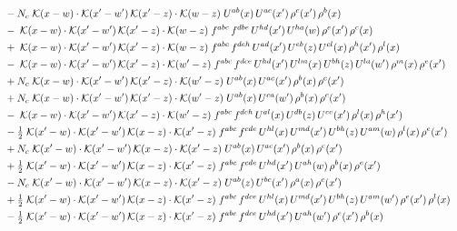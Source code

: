 \documentclass[9pt]{article}
\begin{document}
\begin{align}
&\quad -N_c\;\mathcal{K}(x-w)\cdot\mathcal{K}(x'-w')\,\mathcal{K}(x'-z)\cdot\mathcal{K}(w-z)\;U^{ab}(x)\,U^{ac}(x')\,\rho^{c}(x')\,\rho^{b}(x)\notag\\
&\quad -\;\mathcal{K}(x-w)\cdot\mathcal{K}(x'-w')\,\mathcal{K}(x'-z)\cdot\mathcal{K}(w-z)\;f^{abc}\,f^{dbe}\,U^{hd}(x')\,U^{ha}(w)\,\rho^{e}(x')\,\rho^{c}(x)\notag\\
&\quad +\;\mathcal{K}(x-w)\cdot\mathcal{K}(x'-w')\,\mathcal{K}(x'-z)\cdot\mathcal{K}(w-z)\;f^{abc}\,f^{deh}\,U^{ad}(x')\,U^{eb}(z)\,U^{cl}(x)\,\rho^{h}(x')\,\rho^{l}(x)\notag\\
&\quad -\;\mathcal{K}(x-w)\cdot\mathcal{K}(x'-w')\,\mathcal{K}(x'-z)\cdot\mathcal{K}(w'-z)\;f^{abc}\,f^{dce}\,U^{hd}(x')\,U^{lm}(x)\,U^{bh}(z)\,U^{la}(w')\,\rho^{m}(x)\,\rho^{e}(x')\notag\\
&\quad +N_c\;\mathcal{K}(x-w)\cdot\mathcal{K}(x'-w')\,\mathcal{K}(x'-z)\cdot\mathcal{K}(w'-z)\;U^{ab}(x)\,U^{ac}(x')\,\rho^{b}(x)\,\rho^{c}(x')\notag\\
&\quad +N_c\;\mathcal{K}(x-w)\cdot\mathcal{K}(x'-w')\,\mathcal{K}(x'-z)\cdot\mathcal{K}(w'-z)\;U^{ab}(x)\,U^{ca}(w')\,\rho^{b}(x)\,\rho^{c}(x')\notag\\
&\quad -\;\mathcal{K}(x-w)\cdot\mathcal{K}(x'-w')\,\mathcal{K}(x'-z)\cdot\mathcal{K}(w'-z)\;f^{abc}\,f^{deh}\,U^{al}(x)\,U^{db}(z)\,U^{ce}(x')\,\rho^{l}(x)\,\rho^{h}(x')\notag\\
&\quad -\tfrac{1}{2}\;\mathcal{K}(x'-w)\cdot\mathcal{K}(x'-w')\,\mathcal{K}(x-z)\cdot\mathcal{K}(x'-z)\;f^{abc}\,f^{cde}\,U^{hl}(x)\,U^{md}(x')\,U^{bh}(z)\,U^{am}(w)\,\rho^{l}(x)\,\rho^{e}(x')\notag\\
&\quad +N_c\;\mathcal{K}(x'-w)\cdot\mathcal{K}(x'-w')\,\mathcal{K}(x-z)\cdot\mathcal{K}(x'-z)\;U^{ab}(x)\,U^{ac}(x')\,\rho^{b}(x)\,\rho^{c}(x')\notag\\
&\quad +\tfrac{1}{2}\;\mathcal{K}(x'-w)\cdot\mathcal{K}(x'-w')\,\mathcal{K}(x-z)\cdot\mathcal{K}(x'-z)\;f^{abc}\,f^{cde}\,U^{hd}(x')\,U^{ah}(w)\,\rho^{b}(x)\,\rho^{e}(x')\notag\\
&\quad -N_c\;\mathcal{K}(x'-w)\cdot\mathcal{K}(x'-w')\,\mathcal{K}(x-z)\cdot\mathcal{K}(x'-z)\;U^{ab}(z)\,U^{bc}(x')\,\rho^{a}(x)\,\rho^{c}(x')\notag\\
&\quad +\tfrac{1}{2}\;\mathcal{K}(x'-w)\cdot\mathcal{K}(x'-w')\,\mathcal{K}(x-z)\cdot\mathcal{K}(x'-z)\;f^{abc}\,f^{dce}\,U^{hl}(x)\,U^{md}(x')\,U^{bh}(z)\,U^{am}(w')\,\rho^{e}(x')\,\rho^{l}(x)\notag\\
&\quad -\tfrac{1}{2}\;\mathcal{K}(x'-w)\cdot\mathcal{K}(x'-w')\,\mathcal{K}(x-z)\cdot\mathcal{K}(x'-z)\;f^{abc}\,f^{dce}\,U^{hd}(x')\,U^{ah}(w')\,\rho^{e}(x')\,\rho^{b}(x)\notag\\

\end{align}
\end{document}
